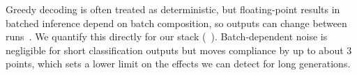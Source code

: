  Greedy decoding is often treated as deterministic, but floating-point results in batched inference depend on batch composition, so outputs can change between runs~\cite{atil2024llm,he2025defeating}. We quantify this directly for our stack (\vllm~\cite{kwon2023efficient}). Batch-dependent noise is negligible for short classification outputs but moves \ifeval compliance by up to about 3 points, which sets a lower limit on the effects we can detect for long generations.
